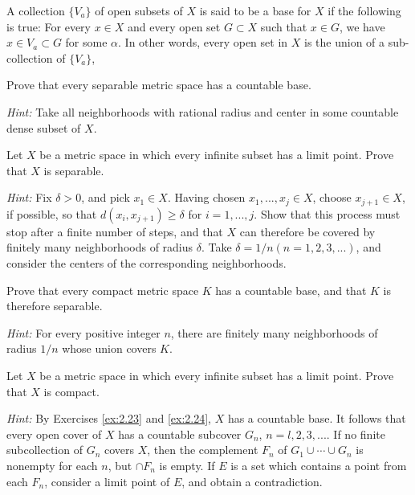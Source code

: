 \begin{myexercise}
    \label{ex:2.23}
    A collection $\{V_a\}$ of open subsets of $X$ is said to be a base for $X$ 
    if the following is true: 
    For every $x \in X$ and every open set $G \subset X$ such that $x \in G$, 
    we have $x \in V_a \subset G$ for some $\alpha$. 
    In other words, every open set in $X$ is the union of a 
    sub-collection of $\{V_a\}$,
    
    Prove that every separable metric space has a countable base. 

    \emph{Hint:} Take all neighborhoods with rational radius 
    and center in some countable dense subset of $X$.
\end{myexercise}

\begin{myexercise}
    \label{ex:2.24}
    Let $X$ be a metric space in which every infinite subset has a limit point. 
    Prove that $X$ is separable. 
    
    \emph{Hint:} Fix $\delta > 0$, and pick $x_1 \in X$. 
    Having chosen $x_1, ... , x_j \in X$,
    choose $x_{j+1} \in X$, 
    if possible, so that $d(x_i, x_{j+1})\geq \delta$ for $i = 1, ... ,j$. 
    Show that this process must stop after a finite number of steps, 
    and that $X$ can therefore be covered by finitely many neighborhoods of radius $\delta$. 
    Take $\delta = 1/n (n = 1, 2, 3, ... )$, 
    and consider the centers of the corresponding neighborhoods.
\end{myexercise}


\begin{myexercise}
    \label{ex:2.25}
    Prove that every compact metric space $K$ has a countable base, 
    and that $K$ is therefore separable. 
    
    \emph{Hint:} For every positive integer $n$, 
    there are finitely many neighborhoods of radius $1/n$ whose union covers $K$.
\end{myexercise}


\begin{myexercise}
    \label{ex:2.26}
    Let $X$ be a metric space in which every infinite subset has a limit point. 
    Prove that $X$ is compact. 
    
    \emph{Hint:} By Exercises \ref{ex:2.23} and \ref{ex:2.24}, 
    $X$ has a countable base. 
    It follows that every open cover of $X$ has a countable subcover ${G_n}$, $n = l, 2, 3, ...$.
    If no finite subcollection of ${G_n}$ covers $X$, 
    then the complement $F_n$ of $G_1 \cup \cdots \cup G_n$
    is nonempty for each $n$, but $\cap F_n$ is empty. 
    If $E$ is a set which contains a point from each $F_n$, 
    consider a limit point of $E$, and obtain a contradiction.
\end{myexercise}


